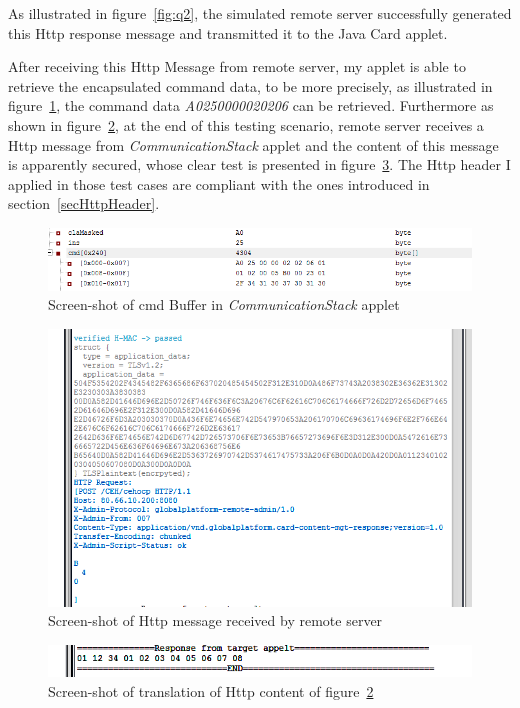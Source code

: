 As illustrated in figure~\ref{fig:q2}, the simulated remote server successfully generated this Http response message and transmitted it to the Java Card applet.

After receiving this Http Message from remote server, my applet is able to retrieve the encapsulated command data, to be more precisely, as illustrated in figure~\ref{fig:remote1}, the command data \emph{A0250000020206} can be retrieved. Furthermore as shown in figure~\ref{fig:q3}, at the end of this testing scenario, remote server receives a Http message from \emph{CommunicationStack} applet and the content of this message is apparently secured, whose clear test is presented in figure~\ref{fig:q4}.
The Http header I applied in those test cases are compliant with the ones introduced in section~\ref{secHttpHeader}.


\begin{figure}[!htb]
	\centering
	\includegraphics[width=1\textwidth]{Images/impl/cmd.png}
		\caption{Screen-shot of {cmd} Buffer in \emph{CommunicationStack} applet}
	\label{fig:remote1}
\end{figure}

\begin{figure}[!htb]
	\centering
	\includegraphics[width=1\textwidth]{q3.png}
		\caption{Screen-shot of Http message received by remote server}
	\label{fig:q3}
\end{figure}

\begin{figure}[!htb]
	\centering
	\includegraphics[width=1\textwidth]{q4.png}
		\caption{Screen-shot of translation of Http content of figure~\ref{fig:q3}}
	\label{fig:q4}
\end{figure}

